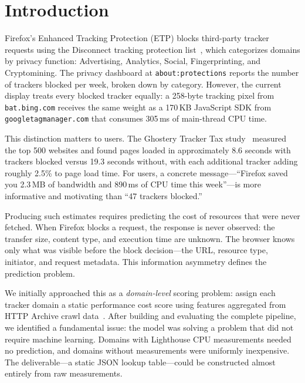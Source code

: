 \documentclass[11pt]{article}
\begin{document}
\tableofcontents
\newpage

\section{Introduction}
\label{sec:introduction}

Firefox's Enhanced Tracking Protection (ETP) blocks third-party tracker requests using the Disconnect tracking protection list~\citep{disconnectlist}, which categorizes domains by privacy function: Advertising, Analytics, Social, Fingerprinting, and Cryptomining. The privacy dashboard at \texttt{about:protections} reports the number of trackers blocked per week, broken down by category. However, the current display treats every blocked tracker equally: a 258-byte tracking pixel from \texttt{bat.bing.com} receives the same weight as a 170\,KB JavaScript SDK from \texttt{googletagmanager.com} that consumes 305\,ms of main-thread CPU time.

This distinction matters to users. The Ghostery Tracker Tax study~\citep{ghostery2020tracker} measured the top 500 websites and found pages loaded in approximately 8.6 seconds with trackers blocked versus 19.3 seconds without, with each additional tracker adding roughly 2.5\% to page load time. For users, a concrete message---``Firefox saved you 2.3\,MB of bandwidth and 890\,ms of CPU time this week''---is more informative and motivating than ``47 trackers blocked.''

Producing such estimates requires predicting the cost of resources that were never fetched. When Firefox blocks a request, the response is never observed: the transfer size, content type, and execution time are unknown. The browser knows only what was visible before the block decision---the URL, resource type, initiator, and request metadata. This information asymmetry defines the prediction problem.

We initially approached this as a \emph{domain-level} scoring problem: assign each tracker domain a static performance cost score using features aggregated from HTTP Archive crawl data~\citep{httparchive}. After building and evaluating the complete pipeline, we identified a fundamental issue: the model was solving a problem that did not require machine learning. Domains with Lighthouse CPU measurements needed no prediction, and domains without measurements were uniformly inexpensive. The deliverable---a static JSON lookup table---could be constructed almost entirely from raw measurements.
\end{document}
